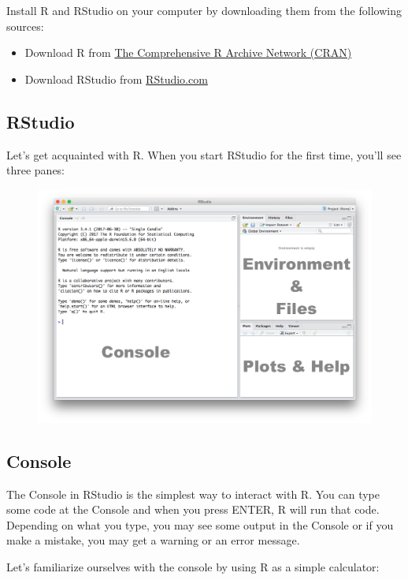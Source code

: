\documentclass[]{book}
\providecommand{\tightlist}{%
  \setlength{\itemsep}{0pt}\setlength{\parskip}{0pt}}
\theoremstyle{definition}
\theoremstyle{definition}
\theoremstyle{definition}
\theoremstyle{remark}
\begin{document}
Install R and RStudio on your computer by downloading them from the
following sources:

\begin{itemize}
\tightlist
\item
  Download R from \href{https://cran.r-project.org}{The Comprehensive R
  Archive Network (CRAN)}
\item
  Download RStudio from \href{https://www.rstudio.com}{RStudio.com}
\end{itemize}

\subsection{RStudio}\label{rstudio}

Let's get acquainted with R. When you start RStudio for the first time,
you'll see three panes:

\begin{figure}
\centering
\includegraphics{./img/rstudio_default.png}
\caption{}
\end{figure}

\subsection{Console}\label{console}

The Console in RStudio is the simplest way to interact with R. You can
type some code at the Console and when you press ENTER, R will run that
code. Depending on what you type, you may see some output in the Console
or if you make a mistake, you may get a warning or an error message.

Let's familiarize ourselves with the console by using R as a simple
calculator:
\end{document}
